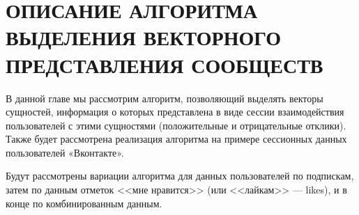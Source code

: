 \documentclass[times,specification,annotation]{itmo-student-thesis}
\begin{document}





\finishrelatedwork

\chapter{ОПИСАНИЕ АЛГОРИТМА ВЫДЕЛЕНИЯ ВЕКТОРНОГО ПРЕДСТАВЛЕНИЯ СООБЩЕСТВ}

В данной главе мы рассмотрим алгоритм, позволяющий выделять векторы
сущностей, информация о которых представлена в виде сессии взаимодействия
пользователей с этими сущностями (положительные и отрицательные отклики).
Также будет рассмотрена реализация алгоритма на примере сессионных данных
пользователей «Вконтакте». 

Будут рассмотрены вариации алгоритма для данных пользователей по подпискам, затем по данным отметок <<мне нравится>> (или <<лайкам>> --- likes), и в конце по комбинированным данным.

\end{document}
